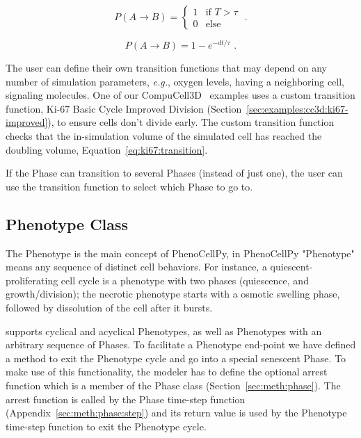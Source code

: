 \begin{equation}\label{eq:phase:transition:deter}
    P(A\rightarrow B) = \begin{cases} 1 & \text{if }T > \tau\\
    0 & \text{else}
    \end{cases}\,\,.
\end{equation}

\begin{equation}\label{eq:phase:transition:stoch}
    P(A\rightarrow B) = 1 - e^{- dt / \tau}\,\,.
\end{equation}

The user can define their own transition functions that may depend on any number of simulation parameters, \textit{e.g.}, oxygen levels, having a neighboring cell, signaling molecules. One of our CompuCell3D~\cite{swat_multi-scale_2012} examples uses a custom transition function, Ki-67 Basic Cycle Improved Division (Section~\ref{sec:examples:cc3d:ki67-improved}), to ensure cells don't divide early. The custom transition function checks that the in-simulation volume of the simulated cell has reached the doubling volume, Equation~\ref{eq:ki67:transition}.

If the Phase can transition to several Phases (instead of just one), the user can use the transition function to select which Phase to go to.

\subsection{Phenotype Class}\label{sec:meth:pheno}
The Phenotype is the main concept of PhenoCellPy, in PhenoCellPy "Phenotype" means any sequence of distinct cell behaviors. For instance, a quiescent-proliferating cell cycle is a phenotype with two phases (quiescence, and growth/division); the necrotic phenotype starts with a osmotic swelling phase, followed by dissolution of the cell after it bursts. 

\pcps supports cyclical and acyclical Phenotypes, as well as Phenotypes with an arbitrary sequence of Phases. To facilitate a Phenotype end-point we have defined a method to exit the Phenotype cycle and go into a special senescent Phase. To make use of this functionality, the modeler has to define the optional arrest function which is a member of the Phase class (Section~\ref{sec:meth:phase}). The arrest function is called by the Phase time-step function (Appendix~\ref{sec:meth:phase:step}) and its return value is used by the Phenotype time-step function to exit the Phenotype cycle.

